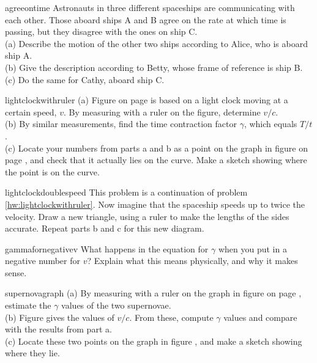 \begin{hwsection}

\begin{hw}{agreeontime}
Astronauts in three different spaceships are communicating with each other.
Those aboard ships A and B agree on the rate at which time is passing, but
they disagree with the ones on ship C. \\
(a) Describe the motion of the other two ships according to Alice, who is aboard
ship A. \\
(b) Give the description according to Betty, whose frame of reference is ship B.\\
(c) Do the same for Cathy, aboard ship C.
\end{hw}

\begin{hw}{lightclockwithruler}
(a) Figure  on page \pageref{fig:lightclocktriangle} is based on a light clock moving at a certain
speed, $v$. By measuring with a ruler on the figure, determine $v/c$.\\
(b) By similar measurements, find the time contraction factor $\gamma$, which equals $T/t$.\\
(c) Locate your numbers from parts a and b as a point on the graph in figure 
on page \pageref{fig:gammagraph}, and check that it actually lies on the curve. Make a sketch showing
where the point is on the curve.\
\end{hw}

\begin{hw}{lightclockdoublespeed}
This problem is a continuation of problem \ref{hw:lightclockwithruler}.
Now imagine that the spaceship speeds up to twice the velocity. Draw a new triangle,
using a ruler to make the lengths of the sides accurate. Repeat parts b and c for this new diagram.
\end{hw}

\begin{hw}{gammafornegativev}
What happens in the equation for $\gamma$ when you put in a negative number for $v$? Explain
what this means physically, and why it makes sense.
\end{hw}

\begin{hw}{supernovagraph}
(a) By measuring with a ruler on the graph in figure  on page \pageref{fig:supernovae},
estimate the $\gamma$ values of the two supernovae.\\
(b) Figure  gives the values of $v/c$. From these, compute $\gamma$ values and
compare with the results from part a.\\
(c) Locate these
two points on the graph in figure , and make a sketch showing where they lie.
\end{hw}


\end{hwsection}

